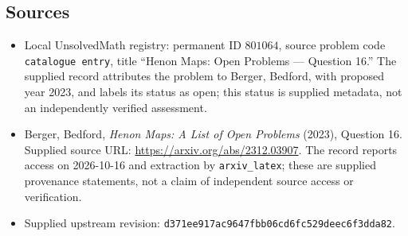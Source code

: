 \documentclass[11pt]{article}
\begin{document}
\subsection{Sources}
\begin{itemize}
\item Local UnsolvedMath registry: permanent ID \(801064\), source problem code \texttt{catalogue entry}, title ``Henon Maps: Open Problems --- Question 16.'' The supplied record attributes the problem to Berger, Bedford, with proposed year 2023, and labels its status as open; this status is supplied metadata, not an independently verified assessment.
\item Berger, Bedford, \emph{Henon Maps: A List of Open Problems} (2023), Question 16. Supplied source URL: \url{https://arxiv.org/abs/2312.03907}. The record reports access on 2026-10-16 and extraction by \texttt{arxiv\_latex}; these are supplied provenance statements, not a claim of independent source access or verification.
\item Supplied upstream revision: \texttt{d371ee917ac9647fbb06cd6fc529deec6f3dda82}.
\end{itemize}
\end{document}

